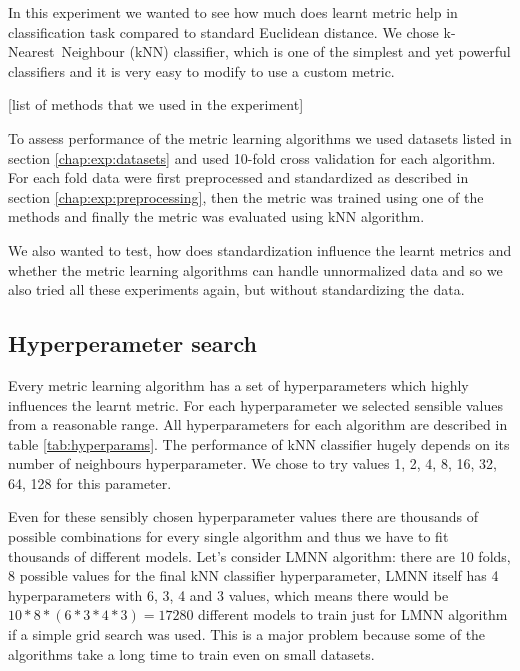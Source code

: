 \documentclass[12pt,a4paper]{report}
\begin{document}
In this experiment we wanted to see how much does learnt metric help in classification task compared to standard Euclidean distance. We chose k-Nearest~Neighbour (kNN) classifier, which is one of the simplest and yet powerful classifiers and it is very easy to modify to use a custom metric.

[list of methods that we used in the experiment] %

To assess performance of the metric learning algorithms we used datasets listed in section \ref{chap:exp:datasets} and used 10-fold cross validation for each algorithm. For each fold data were first preprocessed and standardized as described in section \ref{chap:exp:preprocessing}, then the metric was trained using one of the methods and finally the metric was evaluated using kNN algorithm.

We also wanted to test, how does standardization influence the learnt metrics and whether the metric learning algorithms can handle unnormalized data and so we also tried all these experiments again, but without standardizing the data.

\subsection{Hyperperameter search} \label{chap:exp:hypsearch}

Every metric learning algorithm has a set of hyperparameters which highly influences the learnt metric. For each hyperparameter we selected sensible values from a reasonable range. All hyperparameters for each algorithm are described in table \ref{tab:hyperparams}. The performance of kNN classifier hugely depends on its number of neighbours hyperparameter. We chose to try values 1, 2, 4, 8, 16, 32, 64, 128 for this parameter.



Even for these sensibly chosen hyperparameter values there are thousands of possible combinations for every single algorithm and thus we have to fit thousands of different models. Let’s consider LMNN algorithm: there are 10 folds, 8 possible values for the final kNN classifier hyperparameter, LMNN itself has 4 hyperparameters with 6, 3, 4 and 3 values, which means there would be $10*8*(6*3*4*3)=17280$ different models to train just for LMNN algorithm if a simple grid search was used. This is a major problem because some of the algorithms take a long time to train even on small datasets.
\end{document}
